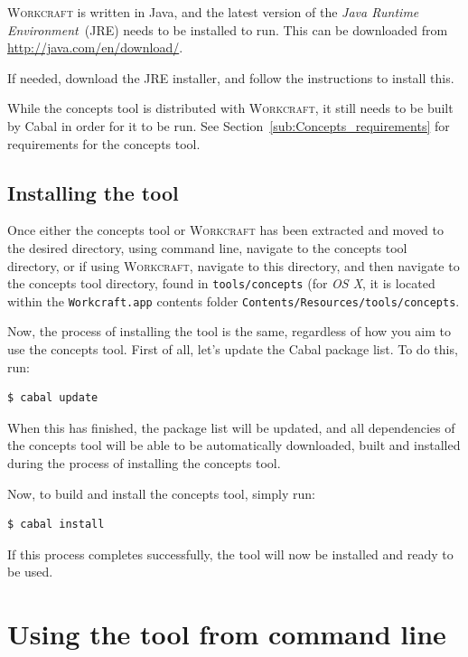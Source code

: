 \documentclass{proc}
\newcommand{\noun}[1]{\textsc{#1}}
\begin{document}
\noun{Workcraft} is written in Java, and the latest version of the \emph{Java Runtime Environment}~(JRE) needs to be installed to run.  This can be downloaded from 
\url{http://java.com/en/download/}. 

If needed, download the JRE installer, and follow the instructions to install this.

While the concepts tool is distributed with \noun{Workcraft}, it still needs to be built by Cabal in order for it to be run. 
See Section~\ref{sub:Concepts_requirements} for requirements for the concepts tool.

\newpage
\subsection{Installing the tool}

Once either the concepts tool or \noun{Workcraft} has been extracted and moved to the desired directory, using command line, navigate to the concepts tool directory, or if using 
\noun{Workcraft}, navigate to this directory, and then navigate to the concepts tool directory, found in \texttt{tools/concepts} (for \emph{OS X}, it is located within the \texttt{Workcraft.app} contents folder \texttt{Contents/Resources/tools/concepts}.

Now, the process of installing the tool is the same, regardless of how you aim to use the concepts tool. First of all, let's update the Cabal package list. To do this, run: 

\begin{lstlisting}[language=bash]
  $ cabal update
\end{lstlisting}

When this has finished, the package list will be updated, and all dependencies of the concepts tool will be able to be automatically downloaded, built and installed during the process of 
installing the concepts tool.

Now, to build and install the concepts tool, simply run:

\begin{lstlisting}[language=bash]
  $ cabal install
\end{lstlisting}

If this process completes successfully, the tool will now be installed and ready to be used.

\section{Using the tool from command line}
\end{document}
